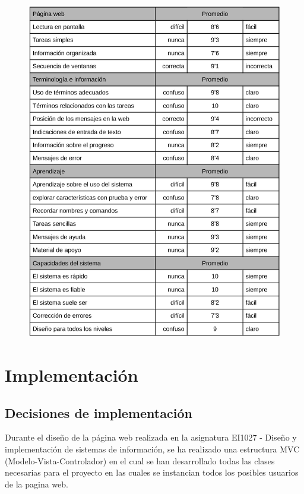 \documentclass[pdftex,11pt,a4paper]{book}
\begin{document}
\begin{figure}[h]
\begin{center}
\includegraphics[width=\textwidth]{img/test_usuarios}
\caption{\label{test_usuarios}}
\end{center}
\end{figure}


\chapter{Implementación}

\section{Decisiones de implementación}

Durante el diseño de la página web realizada en la asignatura EI1027 - Diseño y implementación de sistemas de información, se ha realizado una estructura MVC (Modelo-Vista-Controlador) en el cual se han desarrollado todas las clases necesarias para el proyecto en las cuales se instancian todos los posibles usuarios de la pagina web.
\end{document}
